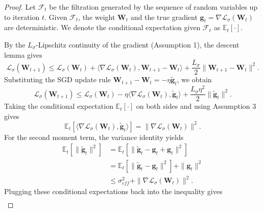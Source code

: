 \documentclass{article}
\begin{document}
\begin{proof}
Let $\mathcal{F}_t$ be the filtration generated by the sequence of random variables up to iteration $t$. Given $\mathcal{F}_t$, the weight $\boldsymbol{W}_t$ and the true gradient $\boldsymbol{g}_t = \nabla \mathcal{L}_\sigma(\boldsymbol{W}_t)$ are deterministic. We denote the conditional expectation given $\mathcal{F}_t$ as $\mathbb{E}_t[\cdot]$.

By the $L_\sigma$-Lipschitz continuity of the gradient (Assumption 1), the descent lemma gives
\begin{equation}
    \mathcal{L}_\sigma(\boldsymbol{W}_{t+1}) \leq \mathcal{L}_\sigma(\boldsymbol{W}_t) + \langle \nabla \mathcal{L}_\sigma(\boldsymbol{W}_t), \boldsymbol{W}_{t+1}-\boldsymbol{W}_t \rangle + \frac{L_\sigma}{2} \|\boldsymbol{W}_{t+1}-\boldsymbol{W}_t\|^2.
\end{equation}
Substituting the SGD update rule $\boldsymbol{W}_{t+1} - \boldsymbol{W}_t = -\eta\tilde{\boldsymbol{g}}_t$, we obtain
\begin{equation}
    \mathcal{L}_\sigma(\boldsymbol{W}_{t+1}) \leq \mathcal{L}_\sigma(\boldsymbol{W}_t) - \eta\langle \nabla \mathcal{L}_\sigma(\boldsymbol{W}_t), \tilde{\boldsymbol{g}}_t\rangle + \frac{L_\sigma\eta^2}{2}\|\tilde{\boldsymbol{g}}_t\|^2.
\end{equation}
Taking the conditional expectation $\mathbb{E}_t[\cdot]$ on both sides and using Assumption 3 gives
\begin{equation}
    \mathbb{E}_t[\langle \nabla \mathcal{L}_\sigma(\boldsymbol{W}_t), \tilde{\boldsymbol{g}}_t\rangle] = \|\nabla \mathcal{L}_\sigma(\boldsymbol{W}_t)\|^2.
\end{equation}
For the second moment term, the variance identity yields
\begin{equation}
\begin{aligned}
    \mathbb{E}_t[\|\tilde{\boldsymbol{g}}_t\|^2]
    &= \mathbb{E}_t[\|\tilde{\boldsymbol{g}}_t - \boldsymbol{g}_t + \boldsymbol{g}_t\|^2] \\
    &= \mathbb{E}_t[\|\tilde{\boldsymbol{g}}_t - \boldsymbol{g}_t\|^2] + \|\boldsymbol{g}_t\|^2 \\
    &\leq \sigma_{eff}^2 + \|\nabla \mathcal{L}_\sigma(\boldsymbol{W}_t)\|^2.
\end{aligned}
\end{equation}
Plugging these conditional expectations back into the inequality gives
\begin{equation}
\begin{aligned}

\end{aligned}
\end{equation}
\end{proof}
\end{document}
